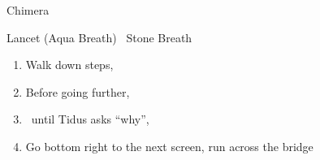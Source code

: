 \begin{battle}{Chimera}
  \begin{itemize}
    \kimahrif Lancet (Aqua Breath)
    \kimahrif \od\ Stone Breath
  \end{itemize}
\end{battle}
\begin{enumerate}[resume]
  \item Walk down steps, \cs[1:30]
  \item Before going further, 
  \item \sd\ until Tidus asks ``why'', \cs[6:20]
  \item Go bottom right to the next screen, run across the bridge
\end{enumerate}